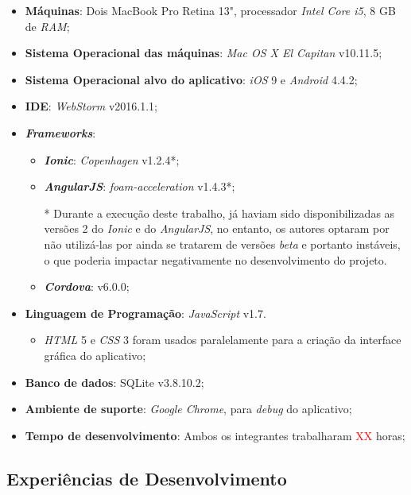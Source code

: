 \begin{itemize}
    \item \textbf{Máquinas}: Dois MacBook Pro Retina 13", processador \textit{Intel Core i5}, 8 GB de \textit{RAM};
    \item \textbf{Sistema Operacional das máquinas}: \textit{Mac OS X El Capitan} v10.11.5;
    \item \textbf{Sistema Operacional alvo do aplicativo}: \textit{iOS} 9 e \textit{Android} 4.4.2;%
    \item \textbf{IDE}: \textit{WebStorm} v2016.1.1;
    \item \textbf{\textit{Frameworks}}:
    \begin{itemize}
        \item \textbf{\textit{Ionic}}: \textit{Copenhagen} v1.2.4*;
        \item \textbf{\textit{AngularJS}}: \textit{foam-acceleration} v1.4.3*;
        
        * Durante a execução deste trabalho, já haviam sido disponibilizadas as versões 2 do \textit{Ionic} e do \textit{AngularJS}, no entanto,
        os autores optaram por não utilizá-las por ainda se tratarem de versões \textit{beta} e portanto instáveis, o que poderia 
        impactar negativamente no desenvolvimento do projeto.
        
        \item \textbf{\textit{Cordova}}: v6.0.0;
    \end{itemize}
    \item \textbf{Linguagem de Programação}: \textit{JavaScript} v1.7. 
    \begin{itemize}
        \item \textit{HTML} 5 e \textit{CSS} 3 foram usados paralelamente para a criação da interface gráfica do aplicativo;
    \end{itemize}
    \item \textbf{Banco de dados}: SQLite v3.8.10.2;
    \item \textbf{Ambiente de suporte}: \textit{Google Chrome}, para \textit{debug} do aplicativo;
    \item \textbf{Tempo de desenvolvimento}: Ambos os integrantes trabalharam \textcolor{red}{XX} horas;
\end{itemize}

\subsection{Experiências de Desenvolvimento} \label{subsec:experienciasdev}

